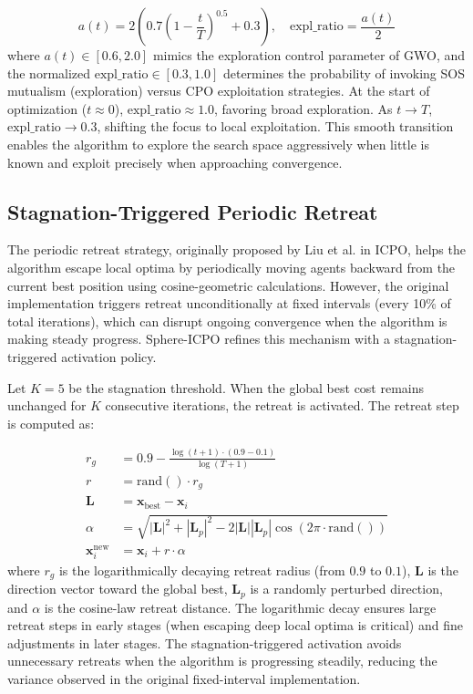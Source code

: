 \documentclass[11pt,a4paper]{article}
\begin{document}
\begin{equation}
    a(t) = 2 \left(0.7\left(1 - \frac{t}{T}\right)^{0.5} + 0.3\right), \quad \text{expl\_ratio} = \frac{a(t)}{2}
\end{equation}
where $a(t) \in [0.6, 2.0]$ mimics the exploration control parameter of GWO, and the normalized $\text{expl\_ratio} \in [0.3, 1.0]$ determines the probability of invoking SOS mutualism (exploration) versus CPO exploitation strategies. At the start of optimization ($t \approx 0$), $\text{expl\_ratio} \approx 1.0$, favoring broad exploration. As $t \rightarrow T$, $\text{expl\_ratio} \rightarrow 0.3$, shifting the focus to local exploitation. This smooth transition enables the algorithm to explore the search space aggressively when little is known and exploit precisely when approaching convergence.

\subsection{Stagnation-Triggered Periodic Retreat}

The periodic retreat strategy, originally proposed by Liu et al. in ICPO, helps the algorithm escape local optima by periodically moving agents backward from the current best position using cosine-geometric calculations. However, the original implementation triggers retreat unconditionally at fixed intervals (every 10\% of total iterations), which can disrupt ongoing convergence when the algorithm is making steady progress. Sphere-ICPO refines this mechanism with a stagnation-triggered activation policy.

Let $K = 5$ be the stagnation threshold. When the global best cost remains unchanged for $K$ consecutive iterations, the retreat is activated. The retreat step is computed as:

\begin{align}
    r_g &= 0.9 - \frac{\log(t+1) \cdot (0.9 - 0.1)}{\log(T+1)} \label{eq:rg} \\
    r &= \text{rand}() \cdot r_g \\
    \mathbf{L} &= \mathbf{x}_{\text{best}} - \mathbf{x}_i \\
    \alpha &= \sqrt{|\mathbf{L}|^2 + |\mathbf{L}_p|^2 - 2|\mathbf{L}||\mathbf{L}_p|\cos(2\pi \cdot \text{rand}())} \\
    \mathbf{x}_i^{\text{new}} &= \mathbf{x}_i + r \cdot \alpha
\end{align}
where $r_g$ is the logarithmically decaying retreat radius (from $0.9$ to $0.1$), $\mathbf{L}$ is the direction vector toward the global best, $\mathbf{L}_p$ is a randomly perturbed direction, and $\alpha$ is the cosine-law retreat distance. The logarithmic decay ensures large retreat steps in early stages (when escaping deep local optima is critical) and fine adjustments in later stages. The stagnation-triggered activation avoids unnecessary retreats when the algorithm is progressing steadily, reducing the variance observed in the original fixed-interval implementation.
\end{document}
